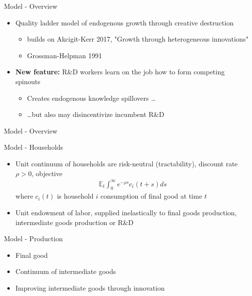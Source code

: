 \documentclass[english,usenames,dvipsnames]{beamer}
\begin{document}
\begin{frame}{Model - Overview}
\begin{itemize}	
	\item Quality ladder model of endogenous growth through creative destruction 
	\begin{itemize}
		\item builds on Akcigit-Kerr 2017, "Growth through heterogeneous innovations"
		\item Grossman-Helpman 1991
	\end{itemize}
	\item \textbf{New feature:} R\&D workers \alert{learn on the job} how to form \alert{competing spinouts}
	\begin{itemize}
		\item Creates \alert{endogenous knowledge spillovers} \ldots
		\item \ldots but also may \alert{disincentivize incumbent R\&D}
	\end{itemize} 
\end{itemize}
\end{frame}

\begin{frame}{Model - Overview}
	\item 
\end{frame}

\begin{frame}{Model - Households}
\begin{itemize}
	\item Unit continuum of households are risk-neutral (tractability), discount rate $\rho > 0$, objective
	\begin{align*}
		\mathbb{E}_t \int_0^{\infty} e^{-\rho s} c_i(t+s) ds
	\end{align*}
	where $c_i(t)$ is household $i$ consumption of final good at time $t$
	\item Unit endowment of labor, supplied inelastically to final goods production, intermediate goods production or R\&D
\end{itemize}
\end{frame}

\begin{frame}{Model - Production}
\begin{itemize}
	\item Final good
	\item Continuum of intermediate goods
	\item Improving intermediate goods through innovation
\end{itemize}
\end{frame}
\end{document}
